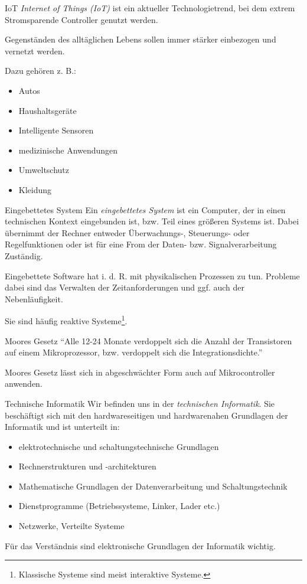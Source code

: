 \begin{defi}{IoT}
    \emph{Internet of Things (IoT)} ist ein aktueller Technologietrend, bei dem extrem Stromsparende Controller genutzt werden.

    Gegenständen des alltäglichen Lebens sollen immer stärker einbezogen und vernetzt werden.

    Dazu gehören z. B.:
    \begin{itemize}
        \item Autos
        \item Haushaltsgeräte
        \item Intelligente Sensoren
        \item medizinische Anwendungen
        \item Umweltschutz
        \item Kleidung
    \end{itemize}
\end{defi}

\begin{defi}{Eingebettetes System}
    Ein \emph{eingebettetes System} ist ein Computer, der in einen technischen Kontext eingebunden ist, bzw. Teil eines größeren Systems ist.
    Dabei übernimmt der Rechner entweder Überwachungs-, Steuerungs- oder Regelfunktionen oder ist für eine From der Daten- bzw. Signalverarbeitung Zuständig.

    Eingebettete Software hat i. d. R. mit physikalischen Prozessen zu tun.
    Probleme dabei sind das Verwalten der Zeitanforderungen und ggf. auch der Nebenläufigkeit.

    Sie sind häufig reaktive Systeme\footnote{Klassische Systeme sind meist interaktive Systeme.}.
\end{defi}

\begin{bonus}{Moores Gesetz}
    \enquote{Alle 12-24 Monate verdoppelt sich die Anzahl der Transistoren auf einem Mikroprozessor, bzw. verdoppelt sich die Integrationsdichte.}

    Moores Gesetz lässt sich in abgeschwächter Form auch auf Mikrocontroller anwenden.
\end{bonus}

\begin{defi}{Technische Informatik}
    Wir befinden uns in der \emph{technischen Informatik}.
    Sie beschäftigt sich mit den hardwareseitigen und hardwarenahen Grundlagen der Informatik und ist unterteilt in:
    \begin{itemize}
        \item elektrotechnische und schaltungstechnische Grundlagen
        \item Rechnerstrukturen und -architekturen
        \item Mathematische Grundlagen der Datenverarbeitung und Schaltungstechnik
        \item Dienstprogramme (Betriebssysteme, Linker, Lader etc.)
        \item Netzwerke, Verteilte Systeme
    \end{itemize}

    Für das Verständnis sind elektronische Grundlagen der Informatik wichtig.
\end{defi}

